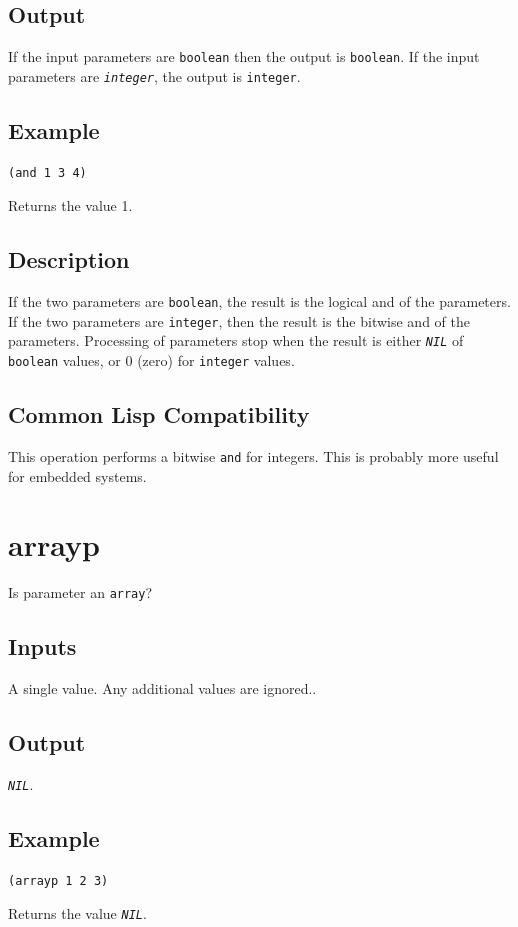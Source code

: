 \documentclass[10pt, openany]{book}
\newcommand{\constant}[1]{\emph{\texttt{#1}}}
\newcommand{\keyword}[1]{\texttt{#1}}
\newcommand{\datatype}[1]{\texttt{#1}}
\begin{document}
\subsection{Output}
If the input parameters are \datatype{boolean} then the output is \datatype{boolean}.  If the input parameters are \constant{integer}, the output is \datatype{integer}.
\subsection{Example}
\begin{lstlisting}
(and 1 3 4)
\end{lstlisting}
Returns the value 1.
\subsection{Description}
If the two parameters are \datatype{boolean}, the result is the logical and of the parameters.  If the two parameters are \datatype{integer}, then the result is the bitwise and of the parameters.  Processing of parameters stop when the result is either \constant{NIL} of \datatype{boolean} values, or 0 (zero) for \datatype{integer} values.
\subsection{Common Lisp Compatibility}
This operation performs a bitwise \keyword{and} for integers.  This is probably more useful for embedded systems.

\section{arrayp}
Is parameter an \datatype{array}?
\subsection{Inputs}
A single value.  Any additional values are ignored..
\subsection{Output}
\constant{NIL}.
\subsection{Example}
\begin{lstlisting}
(arrayp 1 2 3)
\end{lstlisting}
Returns the value \constant{NIL}.
\end{document}
